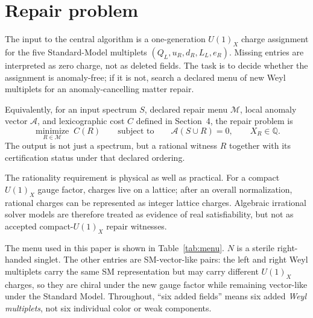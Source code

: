 \documentclass[11pt]{article}
\newcommand{\UX}{U(1)_X}
\begin{document}
\section{Repair problem}

The input to the central algorithm is a one-generation $\UX$ charge assignment
for the five Standard-Model multiplets $(Q_L,u_R,d_R,L_L,e_R)$. Missing entries
are interpreted as zero charge, not as deleted fields. The task is to decide
whether the assignment is anomaly-free; if it is not, search a declared menu of
new Weyl multiplets for an anomaly-cancelling matter repair.

Equivalently, for an input spectrum $S$, declared repair menu $\mathcal M$,
local anomaly vector $\mathcal A$, and lexicographic cost $C$ defined in
Section~4, the repair problem is
\[
\underset{R\in\mathcal M}{\operatorname{minimize}}\; C(R)
\qquad\text{subject to}\qquad
\mathcal A(S\cup R)=0,\qquad X_R\in\mathbb Q .
\]
The output is not just a spectrum, but a rational witness $R$ together with its
certification status under that declared ordering.

The rationality requirement is physical as well as practical. For a compact
$\UX$ gauge factor, charges live on a lattice; after an overall normalization,
rational charges can be represented as integer lattice charges. Algebraic
irrational solver models are therefore treated as evidence of real
satisfiability, but not as accepted compact-$\UX$ repair witnesses.

The menu used in this paper is shown in Table~\ref{tab:menu}. $N$ is a sterile
right-handed singlet. The other entries are SM-vector-like pairs: the left and
right Weyl multiplets carry the same SM representation but may carry different
$\UX$ charges, so they are chiral under the new gauge factor while remaining
vector-like under the Standard Model. Throughout, ``six added fields'' means six
added \emph{Weyl multiplets}, not six individual color or weak components.
\end{document}
